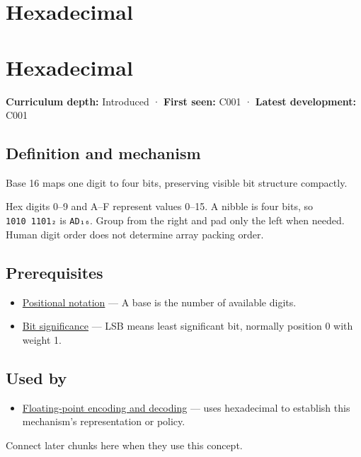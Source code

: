 \hypertarget{appendix-6b8075763724}{}
\section*{Hexadecimal}
\section{Hexadecimal}\label{hexadecimal}

\textbf{Curriculum depth:} Introduced · \textbf{First seen:} C001 · \textbf{Latest development:} C001

\subsection{Definition and mechanism}\label{definition-and-mechanism}

Base 16 maps one digit to four bits, preserving visible bit structure compactly.

Hex digits 0--9 and A--F represent values 0--15. A nibble is four bits, so \texttt{1010\ 1101₂} is \texttt{AD₁₆}. Group from the right and pad only the left when needed. Human digit order does not determine array packing order.

\subsection{Prerequisites}\label{prerequisites}

\begin{itemize}
\tightlist
\item
  \hyperref[appendix-83c3f28f7bda]{Positional notation} --- A base is the number of available digits.
\item
  \hyperref[appendix-280445746493]{Bit significance} --- LSB means least significant bit, normally position 0 with weight 1.
\end{itemize}

\subsection{Used by}\label{used-by}

\begin{itemize}
\tightlist
\item
  \hyperref[appendix-6854d0e2218e]{Floating-point encoding and decoding} --- uses hexadecimal to establish this mechanism's representation or policy.
\end{itemize}

Connect later chunks here when they use this concept.

